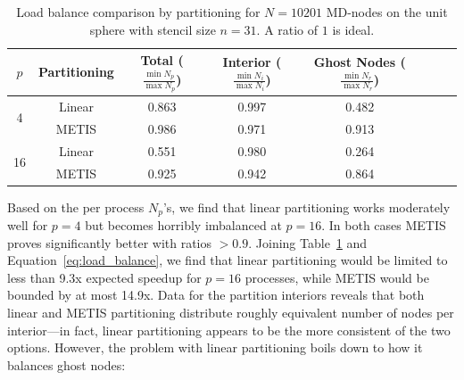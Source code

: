 \documentclass{report}
\begin{document}
\begin{table}
\centering
\caption{Load balance comparison by partitioning for $N=10201$ MD-nodes on the unit sphere with stencil size $n=31$. A ratio of $1$ is ideal.}
\label{tbl:load_balance}
\begin{tabular}{c|c|c|c|c|c|c|c}
$p$ & Partitioning & Total ($\frac{\min N_p}{\max N_p}$) &  Interior ($\frac{\min N_i}{\max N_i}$) & Ghost Nodes ($\frac{\min N_r}{\max N_r}$)  \\ \hline
\multirow{2}{*}{4} & Linear  &  0.863 & 0.997 & 0.482  \\
& METIS  & 0.986 & 0.971 & 0.913   \\ \hline
\multirow{2}{*}{16} & Linear &  0.551 & 0.980 & 0.264   \\
& METIS & 0.925 & 0.942 & 0.864  \\
\end{tabular}
\end{table}
%
Based on the per process $N_p$'s, we find that linear partitioning works moderately well for $p=4$ but becomes horribly imbalanced at $p=16$. In both cases METIS proves significantly better with ratios $> 0.9$. Joining Table~\ref{tbl:load_balance} and Equation~\ref{eq:load_balance}, we find that linear partitioning would be limited to less than 9.3x expected speedup for $p=16$ processes, while METIS would be bounded by at most 14.9x. Data for the partition interiors reveals that both linear and METIS partitioning distribute roughly equivalent number of nodes per interior---in fact, linear partitioning appears to be the more consistent of the two options. However, the problem with linear partitioning boils down to how it balances ghost nodes:
\end{document}
